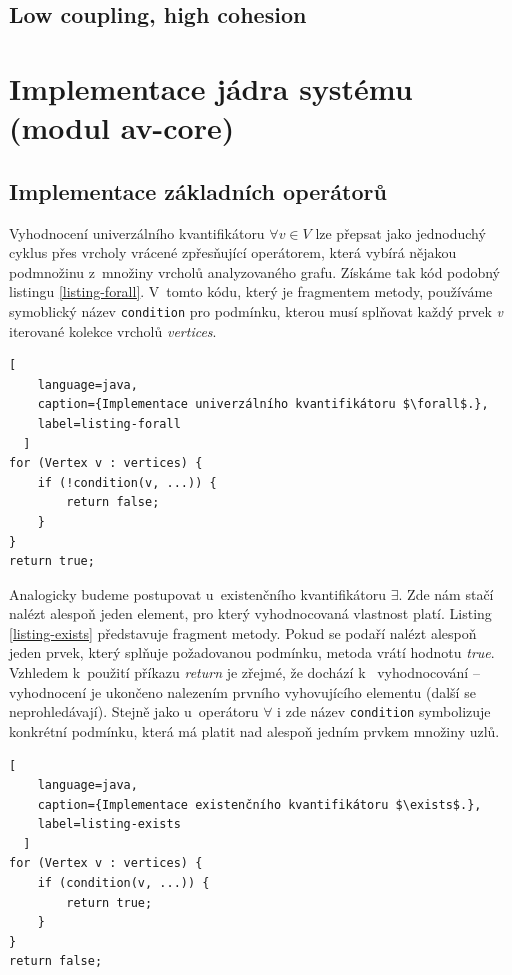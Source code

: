 \subsection{Low coupling, high cohesion}

\section{Implementace jádra systému (modul av-core)}

\subsection{Implementace základních operátorů}
Vyhodnocení univerzálního kvantifikátoru $\forall v \in V$ lze přepsat jako jednoduchý cyklus přes vrcholy vrácené zpřesňující operátorem, která vybírá nějakou podmnožinu z~množiny vrcholů analyzovaného grafu. Získáme tak kód podobný listingu \ref{listing-forall}. V~tomto kódu, který je fragmentem metody, používáme symoblický název \verb+condition+ pro podmínku, kterou musí splňovat každý prvek \emph{v} iterované kolekce vrcholů \emph{vertices}.

\begin{lstlisting}[
    language=java,
    caption={Implementace univerzálního kvantifikátoru $\forall$.},
    label=listing-forall
  ]
for (Vertex v : vertices) {
    if (!condition(v, ...)) {
        return false;
    }
}
return true;
\end{lstlisting}

Analogicky budeme postupovat u~existenčního kvantifikátoru $\exists$. Zde nám stačí nalézt alespoň jeden element, pro který vyhodnocovaná vlastnost platí. Listing \ref{listing-exists} představuje fragment metody. Pokud se podaří nalézt alespoň jeden prvek, který splňuje požadovanou podmínku, metoda vrátí hodnotu \emph{true}. Vzhledem k~použití příkazu \emph{return} je zřejmé, že dochází k~ vyhodnocování -- vyhodnocení je ukončeno nalezením prvního vyhovujícího elementu (další se neprohledávají). Stejně jako u~operátoru $\forall$ i zde název \verb+condition+ symbolizuje konkrétní podmínku, která má platit nad alespoň jedním prvkem množiny uzlů.

\begin{lstlisting}[
    language=java,
    caption={Implementace existenčního kvantifikátoru $\exists$.},
    label=listing-exists
  ]
for (Vertex v : vertices) {
    if (condition(v, ...)) {
        return true;
    }
}
return false;
\end{lstlisting}

